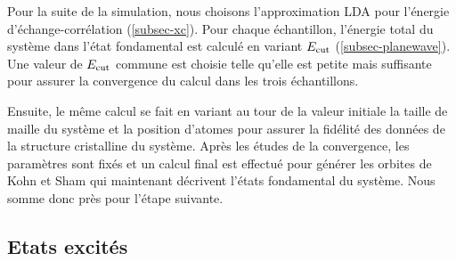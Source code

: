 Pour la suite de la simulation,
nous choisons l'approximation LDA pour l'énergie d'échange-corrélation (\cref{subsec-xc}).
Pour chaque échantillon, l'énergie total du système dans l'état fondamental est calculé
en variant $E_{\textnormal{cut}}$ (\cref{subsec-planewave}).
Une valeur de $E_{\textnormal{cut}}$ commune est choisie telle qu'elle est petite mais suffisante
pour assurer la convergence du calcul dans les trois échantillons.

Ensuite, le même calcul se fait en variant au tour de la valeur initiale
la taille de maille du système et la position d'atomes pour assurer la fidélité
des données de la structure cristalline du système.
Après les études de la convergence, les paramètres sont fixés et un calcul final est effectué
pour générer les orbites de Kohn et Sham qui maintenant décrivent l'états fondamental du système.
Nous somme donc près pour l'étape suivante.

\subsection{Etats excités}

